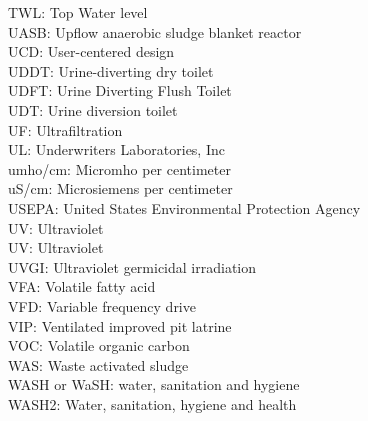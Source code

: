 \documentclass{article}
\begin{document}
TWL:  Top Water level
\vspace{0.3cm}\\
UASB:  Upflow anaerobic sludge blanket reactor
\vspace{0.3cm}\\
UCD:  User-centered design
\vspace{0.3cm}\\
UDDT:  Urine-diverting dry toilet
\vspace{0.3cm}\\
UDFT:  Urine Diverting Flush Toilet
\vspace{0.3cm}\\
UDT:  Urine diversion toilet
\vspace{0.3cm}\\
UF: Ultrafiltration
\vspace{0.3cm}\\
UL:  Underwriters Laboratories, Inc
\vspace{0.3cm}\\
umho/cm:  Micromho per centimeter
\vspace{0.3cm}\\
uS/cm:  Microsiemens per centimeter
\vspace{0.3cm}\\
USEPA:  United States Environmental Protection Agency
\vspace{0.3cm}\\
UV:  Ultraviolet
\vspace{0.3cm}\\
UV: Ultraviolet
\vspace{0.3cm}\\
UVGI:  Ultraviolet germicidal irradiation
\vspace{0.3cm}\\
VFA:  Volatile fatty acid
\vspace{0.3cm}\\
VFD:  Variable frequency drive
\vspace{0.3cm}\\
VIP:  Ventilated improved pit latrine
\vspace{0.3cm}\\
VOC:  Volatile organic carbon
\vspace{0.3cm}\\
WAS:  Waste activated sludge
\vspace{0.3cm}\\
WASH or WaSH:  water, sanitation and hygiene
\vspace{0.3cm}\\
WASH2:  Water, sanitation, hygiene and health
\end{document}
